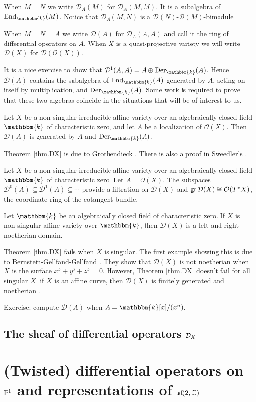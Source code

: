 \documentclass[12pt]{article}
\newcommand{\Bbbk}{\mathbbm{k}}
\newcommand{\cD}{\mathcal D}
\newcommand{\cO}{\mathcal O}
\begin{document}
When $M=N$ we write $\cD_A(M)$ for $\cD_A(M,M)$. It is a subalgebra of $\End_\Bbbk(M)$. Notice that $ \cD_A(M,N)$ is a $\cD(N)$-$\cD(M)$-bimodule 

When $M=N=A$ we  write $\cD(A)$ for $\cD_A(A,A)$ and call it {\sf the ring of differential operators on $A$}.
When $X$ is a quasi-projective variety  we will write $\cD(X)$ for $\cD(\cO(X))$.


It is a nice exercise to show that $\cD^1(A,A) = A \oplus \Der_\Bbbk(A)$. Hence $\cD(A)$ contains the subalgebra of 
$\End_\Bbbk(A)$  generated by $A$, acting on itself by multiplication,  and $\Der_\Bbbk(A)$.
Some work is required to prove that these two algebras coincide in the situations that will be of interest to us.


\begin{thm} 
\label{thm.DX}
Let $X$ be a non-singular irreducible affine variety over an algebraically closed field $\Bbbk$ of characteristic zero, and
let $A$ be a localization of $\cO(X)$. Then $\cD(A)$ is generated by $A$ and $\Der_\Bbbk(A)$.
\end{thm} 

Theorem \ref{thm.DX} is due to Grothendieck \cite{egaIV-vol32}. There is also a proof in Sweedler's \cite{sweedler74}. 

\begin{thm} 
\label{thm.T*X}
Let $X$ be a non-singular irreducible affine variety over an algebraically closed field $\Bbbk$ of characteristic zero.
Let $A=\cO(X)$.
The subspaces $\cD^0(A) \subseteq  \cD^1(A) \subseteq \cdots$ provide a filtration on $\cD(X)$
and ${\sf gr}\,\cD(X) \cong \cO(T^*X)$, the coordinate ring of the cotangent bundle. 
\end{thm} 

 

\begin{cor} 
\label{cor.DX}
Let $\Bbbk$ be an algebraically closed field of characteristic zero. If $X$ is non-singular affine variety over $\Bbbk$, then
$\cD(X)$ is a left and right noetherian domain.
\end{cor} 


Theorem  \ref{thm.DX} fails when $X$ is singular. 
The first example showing this is due to Bernstein-Gel'fand-Gel'fand \cite{bgg72}. They show that 
$\cD(X)$ is not noetherian when $X$ is the surface $x^3+y^3+z^3=0$. 
However, Theorem  \ref{thm.DX} doesn't fail for all singular $X$: if $X$ is an affine curve, then $\cD(X)$ is finitely generated and noetherian \cite{ss88}.

Exercise: compute $\cD(A)$ when $A=\Bbbk[x]/(x^n)$. 



\subsection{The sheaf of differential operators $\calD_X$}



\section{(Twisted)  differential operators on $\P 1$ and representations of $\sl(2,\bbC)$}



\printbibliography
\end{document}
